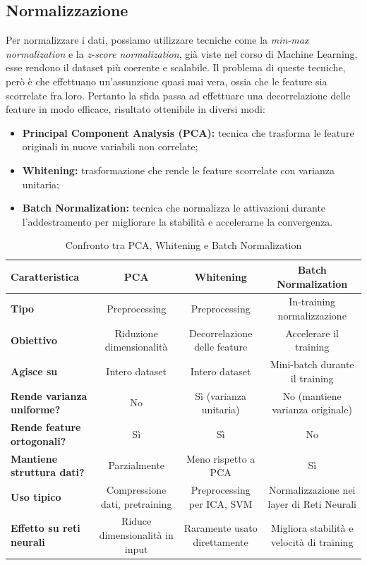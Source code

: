 \subsection{Normalizzazione}
Per normalizzare i dati, possiamo utilizzare tecniche come la \textit{min-max normalization} e la \textit{z-score normalization}, già viste nel corso di Machine Learning, esse rendono il dataset più coerente e scalabile. Il problema di queste tecniche, però è che effettuano un'assunzione quasi mai vera, ossia che le feature sia scorrelate fra loro. Pertanto la sfida passa ad effettuare una decorrelazione delle feature in modo efficace, risultato ottenibile in diversi modi:
\begin{itemize}
\item\textbf{Principal Component Analysis (PCA):} tecnica che trasforma le feature originali in nuove variabili non correlate;
\item\textbf{Whitening:} trasformazione che rende le feature scorrelate con varianza unitaria;
\item\textbf{Batch Normalization:} tecnica che normalizza le attivazioni durante l'addestramento per migliorare la stabilità e accelerarne la convergenza.
\end{itemize}

\begin{table}[!ht]
    \centering
    \caption{Confronto tra PCA, Whitening e Batch Normalization}
    \begin{adjustbox}{width=\textwidth}
    \begin{tabular}{@{} lccc @{}}
        \toprule
        \textbf{Caratteristica} & \textbf{PCA} & \textbf{Whitening} & \textbf{Batch Normalization} \\
        \midrule
        \textbf{Tipo} & Preprocessing & Preprocessing & In-training normalizzazione \\
        \textbf{Obiettivo} & Riduzione dimensionalità & Decorrelazione delle feature & Accelerare il training \\
        \textbf{Agisce su} & Intero dataset & Intero dataset & Mini-batch durante il training \\
        \textbf{Rende varianza uniforme?} & No & Sì (varianza unitaria) & No (mantiene varianza originale) \\
        \textbf{Rende feature ortogonali?} & Sì & Sì & No \\
        \textbf{Mantiene struttura dati?} & Parzialmente & Meno rispetto a PCA & Sì \\
        \textbf{Uso tipico} & Compressione dati, pretraining & Preprocessing per ICA, SVM & Normalizzazione nei layer di Reti Neurali \\
        \textbf{Effetto su reti neurali} & Riduce dimensionalità in input & Raramente usato direttamente & Migliora stabilità e velocità di training \\
        \bottomrule
    \end{tabular}
    \end{adjustbox}
\end{table}

